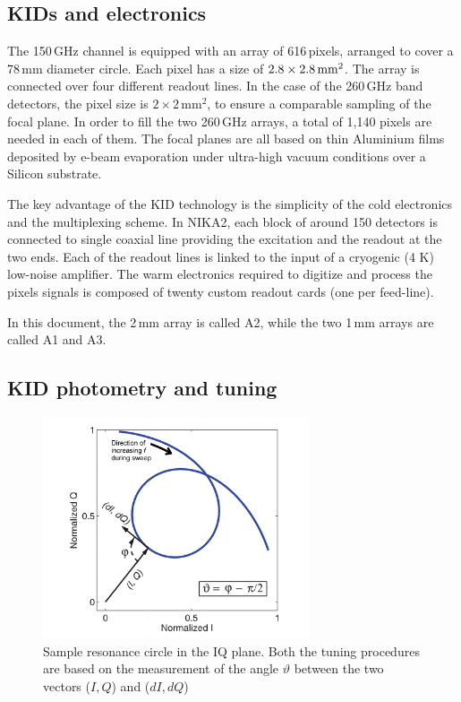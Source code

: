 \subsection{KIDs and electronics}
\label{se:array}

The 150\,GHz channel is equipped with an array of 616\,pixels, arranged to cover
a 78\,mm diameter circle. Each pixel has a size of
$2.8\times2.8\textrm{\,mm}^2$. The array is connected over four different
readout lines. In the case of the 260\,GHz band detectors, the pixel size is
$2\times 2\mathrm{\,mm}^2$, to ensure a comparable sampling of the focal
plane. In order to fill the two 260\,GHz arrays, a total of 1,140 pixels are
needed in each of them. The focal planes are all based on thin Aluminium films
deposited by e-beam evaporation under ultra-high vacuum conditions over a
Silicon substrate.

The key advantage of the KID technology is the simplicity of the cold
electronics and the multiplexing scheme. In NIKA2, each block of around 150
detectors is connected to single coaxial line providing the excitation and the
readout at the two ends. Each of the readout lines is linked to the input of a
cryogenic (4 K) low-noise amplifier. The warm electronics required to digitize
and process the pixels signals is composed of twenty custom readout cards (one
per feed-line).

In this document, the 2\,mm array is called A2, while the two 1\,mm arrays are
called A1 and A3.


\subsection{KID photometry and tuning}

\begin{figure}[!b]
\begin{center}
\includegraphics[width = 0.7\textwidth]{Figures/resoCircle-eps-converted-to.pdf}
\caption[KID resonance circle]{Sample resonance circle in the IQ plane. Both the
  tuning procedures are based on the measurement of the angle $\vartheta$
  between the two vectors ($I, Q$) and ($dI, dQ$)}
\label{figResoCircle}
\end{center}
\end{figure}


